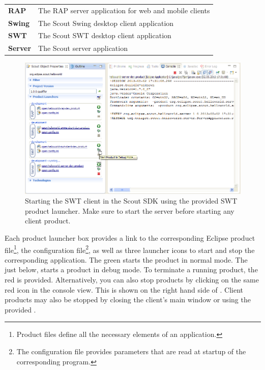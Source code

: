 \documentclass[a4paper,10pt,twoside]{book}
\begin{document}
\begin{tabular}{ l l }
  \textbf{RAP}    & The RAP server application for web and mobile clients\\
  \textbf{Swing}  & The Scout Swing desktop client application\\
  \textbf{SWT}    & The Scout SWT desktop client application\\
  \textbf{Server} & The Scout server application\\
\end{tabular}

\begin{figure}
\includegraphics[width=14cm]{sdk_start_client_product.png} 
\caption{Starting the SWT client in the Scout SDK using the provided SWT product launcher. Make sure to start the server before starting any client product.}
\end{figure}

Each product launcher box provides a link to the corresponding Eclipse product file\footnote{
Product files define all the necessary elements of an application.
},
the configuration file\footnote{
The configuration file  provides parameters that are read at startup of the corresponding program.
},
as well as three launcher icons to start and stop the corresponding application.
The green  starts the product in normal mode.
The  just below, starts a product in debug mode.
To terminate a running product, the red  is provided. 
Alternatively, you can also stop products by clicking on the same red icon in the console view.
This is shown on the right hand side of .
Client products may also be stopped by closing the client's main window or using the provided .
\end{document}
